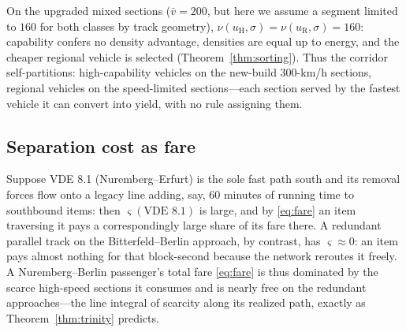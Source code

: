 \documentclass[11pt,twocolumn,a4paper]{article}
\theoremstyle{definition}
\theoremstyle{remark}
\newcommand{\sep}{\varsigma}
\begin{document}
On the upgraded mixed sections ($\bar v = 200$, but here we assume a segment limited to $160$ for both classes by track geometry), $\nu(u_{\mathrm H},\sigma)=\nu(u_{\mathrm R},\sigma)=160$: capability confers no density advantage, densities are equal up to energy, and the cheaper regional vehicle is selected (Theorem~\ref{thm:sorting}). Thus the corridor self-partitions: high-capability vehicles on the new-build 300-km/h sections, regional vehicles on the speed-limited sections---each section served by the fastest vehicle it can convert into yield, with no rule assigning them.

\subsection{Separation cost as fare}

Suppose VDE 8.1 (Nuremberg--Erfurt) is the sole fast path south and its removal forces flow onto a legacy line adding, say, 60 minutes of running time to southbound items: then $\sep(\text{VDE 8.1})$ is large, and by \eqref{eq:fare} an item traversing it pays a correspondingly large share of its fare there. A redundant parallel track on the Bitterfeld--Berlin approach, by contrast, has $\sep\approx 0$: an item pays almost nothing for that block-second because the network reroutes it freely. A Nuremberg--Berlin passenger's total fare \eqref{eq:fare} is thus dominated by the scarce high-speed sections it consumes and is nearly free on the redundant approaches---the line integral of scarcity along its realized path, exactly as Theorem~\ref{thm:trinity} predicts.
\end{document}
